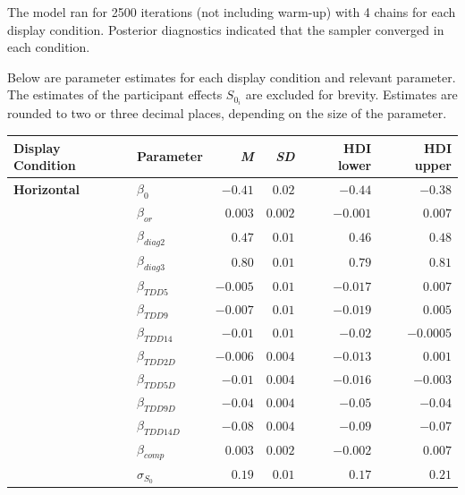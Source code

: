 The model ran for 2500 iterations (not including warm-up) with 4 chains for each display condition. Posterior diagnostics indicated that the sampler converged in each condition.

Below are parameter estimates for each display condition and relevant parameter. The estimates of the participant effects $S_{0_i}$ are excluded for brevity. Estimates are rounded to two or three decimal places, depending on the size of the parameter.
    
\begin{table}[ht]
    \centering
    \begin{tabular}{llrrrr}
        \toprule
        Display Condition & Parameter & \textit{M} & \textit{SD} & HDI lower & HDI upper \\
        \midrule
        \textbf{Horizontal}  &  $\beta_{0}$     &    $-0.41$   &   $0.02$    &  $-0.44$     & $-0.38$     \\
                    &  $\beta_{or}$    &    $0.003$   &   $0.002$   &  $-0.001$    & $0.007$     \\
                    &  $\beta_{diag2}$ &    $0.47$    &   $0.01$    &  $0.46$      & $0.48$      \\
                    &  $\beta_{diag3}$ &    $0.80$    &   $0.01$    &  $0.79$      & $0.81$      \\
                    &  $\beta_{TDD5}$  &    $-0.005$  &   $0.01$    &  $-0.017$    & $0.007$     \\
                    &  $\beta_{TDD9}$  &    $-0.007$  &   $0.01$    &  $-0.019$    & $0.005$     \\
                    &  $\beta_{TDD14}$ &    $-0.01$   &   $0.01$    &  $-0.02$     & $-0.0005$   \\
                    &  $\beta_{TDD2D}$ &    $-0.006$  &   $0.004$   &  $-0.013$    & $0.001$     \\
                    &  $\beta_{TDD5D}$ &    $-0.01$   &   $0.004$   &  $-0.016$    & $-0.003$    \\
                    &  $\beta_{TDD9D}$ &    $-0.04$   &   $0.004$   &  $-0.05$     & $-0.04$     \\
                    &  $\beta_{TDD14D}$&    $-0.08$   &   $0.004$   &  $-0.09$     & $-0.07$     \\
                    &  $\beta_{comp}$  &    $0.003$   &   $0.002$   &  $-0.002$    & $0.007$     \\
                    &  $\sigma_{S_0}$  &    $0.19$    &   $0.01$    &  $0.17$      & $0.21$      \\

\end{tabular}
\end{table}
